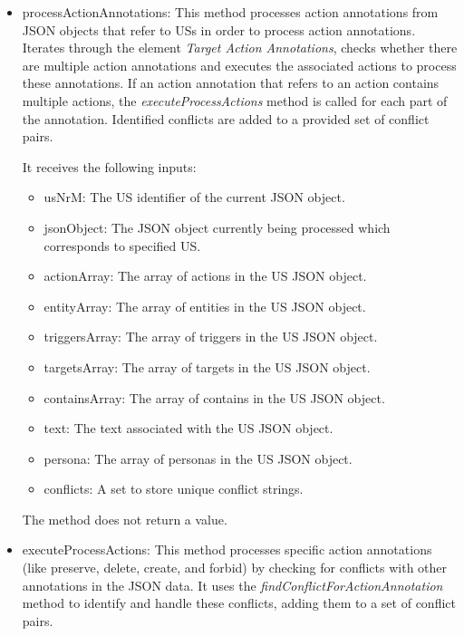 \begin{itemize}
	\item processActionAnnotations: This method processes action annotations from JSON objects that refer to USs in order to process action annotations. Iterates through the element \textit{Target Action Annotations}, checks whether there are multiple action annotations and executes the associated actions to process these annotations. If an action annotation that refers to an action contains multiple actions, the \textit{executeProcessActions} method is called for each part of the annotation. Identified conflicts are added to a provided set of conflict pairs.
	
	It receives the following inputs:
	\begin{itemize}
		\item usNrM: The US identifier of the current JSON object.
		
		\item jsonObject: The JSON object currently being processed which corresponds to specified US.
		
		\item actionArray: The array of actions in the US JSON object.
		
		\item entityArray: The array of entities in the US JSON object.
		
		\item triggersArray: The array of triggers in the US JSON object.
		
		\item targetsArray: The array of targets in the US JSON object.
		
		\item containsArray: The array of contains in the US JSON object.
		
		\item text: The text associated with the US JSON object.
		
		\item persona: The array of personas in the US JSON object.
		
		\item conflicts: A set to store unique conflict strings.
	\end{itemize}
	The method does not return a value.
	
	\item executeProcessActions: This method processes specific action annotations (like preserve, delete, create, and forbid) by checking for conflicts with other annotations in the JSON data. It uses the \textit{findConflictForActionAnnotation} method to identify and handle these conflicts, adding them to a set of conflict pairs.
	

\end{itemize}

